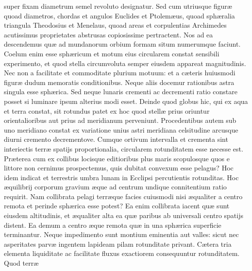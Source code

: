 \documentclass[11pt,a4paper]{article}
\begin{document}
super fixam diametrum semel revoluto designatur. Sed cum utriusque figuræ quoad diametros, chordas et angulos Euclides et Ptolemæus, quoad sphæralia triangula Theodosius et Menelaus, quoad areas et corpulentias Archimedes acutissimus proprietates abstrusas copiosissime pertractent. Nos ad ea descendemus quæ ad mundanorum orbium formam situm numerumque faciunt. Coelum enim esse sphæricum et motum eius circularem constat sensibili experimento, et quod stella circumvoluta semper eiusdem appareat magnitudinis. Nec non a facilitate et commoditate plurium motuum: et a cæteris huiusmodi figuræ dudum memoratis conditionibus. Neque aliis docemur rationibus astra singula esse sphærica. Sed neque lunaris crementi ac decrementi ratio constare posset si luminare ipsum alterius modi esset. Deinde quod globus hic, qui ex aqua et terra constat, sit rotundus patet ex hoc quod stellæ prius oriuntur orientalioribus aut prius ad meridianum perveniunt. Procedentibus autem sub uno meridiano constat ex variatione unius astri meridiana celsitudine arcusque diurni cremento decrementove. Cumque \ill{} ortivum intervalla et crementa sint interiectis terræ spatijs proportionalia, circularem rotunditatem esse necesse est. Præterea cum ex collibus locisque editioribus plus maris scopulosque quos e littore non cernimus prospectemus, quis dubitat convexum esse pelagus? Hoc idem indicat et terrestris umbra lunam in Ecclipsi percutientis rotunditas. Hoc æquilibrij corporum gravium æque ad centrum undique connitentium ratio requirit. Nam collibrata pelagi terræque facies cuiusmodi nisi æqualiter a centro remota et perinde sphærica esse potest? Ea enim collibrata iacent quæ sunt eiusdem altitudinis, et æqualiter alta ea quæ paribus ab universali centro spatijs distent. Ea demum a centro æque remota quæ in una sphærica superficie terminantur. Neque impedimento sunt montium eminentia aut valles: sicut nec asperitates parvæ ingentem lapideam pilam rotunditate privant. Cætera tria elementa liquiditate ac facilitate fluxus exactiorem consequuntur rotunditatem. Quod terræ
\end{document}
